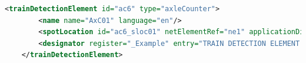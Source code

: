     \begin{lstlisting}[language = XML, caption = Clase trainDetectionElement , label = {lst:axleCounter}]
    <trainDetectionElement id="ac6" type="axleCounter">
        <name name="AxC01" language="en"/>
        <spotLocation id="ac6_sloc01" netElementRef="ne1" applicationDirection="both" intrinsicCoord="0.6710"/>
        <designator register="_Example" entry="TRAIN DETECTION ELEMENT AxC01"/>
    </trainDetectionElement>
    \end{lstlisting}